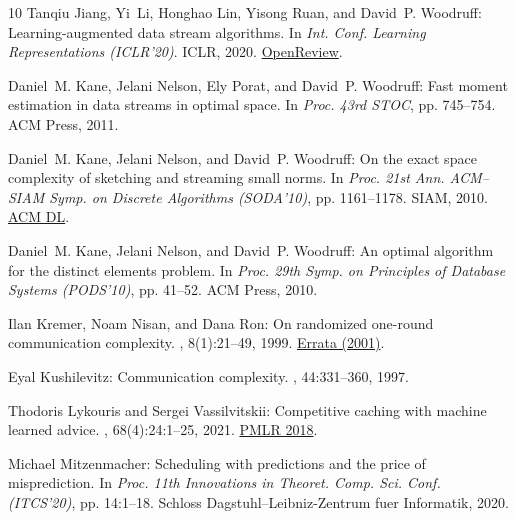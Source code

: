 \begin{thebibliography}{10}
{\sc Tanqiu Jiang, Yi~Li, Honghao Lin, Yisong Ruan, and David~P. Woodruff}:
  Learning-augmented data stream algorithms.
\newblock In {\em Int. Conf. Learning Representations (ICLR'20)}. ICLR, 2020.
\newblock \href{https://openreview.net/forum?id=HyxJ1xBYDH}{OpenReview}.

{\sc Daniel~M. Kane, Jelani Nelson, Ely Porat, and David~P. Woodruff}: Fast
  moment estimation in data streams in optimal space.
\newblock In {\em Proc. 43rd STOC}, pp. 745--754. ACM Press, 2011.

{\sc Daniel~M. Kane, Jelani Nelson, and David~P. Woodruff}: On the exact space
  complexity of sketching and streaming small norms.
\newblock In {\em Proc. 21st Ann. ACM--SIAM Symp. on Discrete Algorithms
  (SODA'10)}, pp. 1161--1178. SIAM, 2010.
\newblock \href{https://dl.acm.org/doi/10.5555/1873601.1873694}{ACM DL}.

{\sc Daniel~M. Kane, Jelani Nelson, and David~P. Woodruff}: An optimal
  algorithm for the distinct elements problem.
\newblock In {\em Proc. 29th Symp. on Principles of Database Systems
  (PODS'10)}, pp. 41--52. ACM Press, 2010.
\newblock [\epfmtdoi{10.1145/1807085.1807094}]

{\sc Ilan Kremer, Noam Nisan, and Dana Ron}: On randomized one-round
  communication complexity.
, 8(1):21--49, 1999.
\newblock \href{https://doi.org/10.1007/s000370100003}{Errata (2001)}.
\newblock [\epfmtdoi{10.1007/s000370050018}]

{\sc Eyal Kushilevitz}: Communication complexity.
, 44:331--360, 1997.
\newblock [\epfmtdoi{10.1016/S0065-2458(08)60342-3}]

{\sc Thodoris Lykouris and Sergei Vassilvitskii}: Competitive caching with
  machine learned advice.
, 68(4):24:1--25, 2021.
\newblock \prelim
  \href{https://proceedings.mlr.press/v80/lykouris18a.html}{PMLR 2018}.

{\sc Michael Mitzenmacher}: Scheduling with predictions and the price of
  misprediction.
\newblock In {\em Proc. 11th Innovations in Theoret. Comp. Sci. Conf.
  (ITCS'20)}, pp. 14:1--18. Schloss Dagstuhl--Leibniz-Zentrum fuer Informatik,
  2020.


\end{thebibliography}
